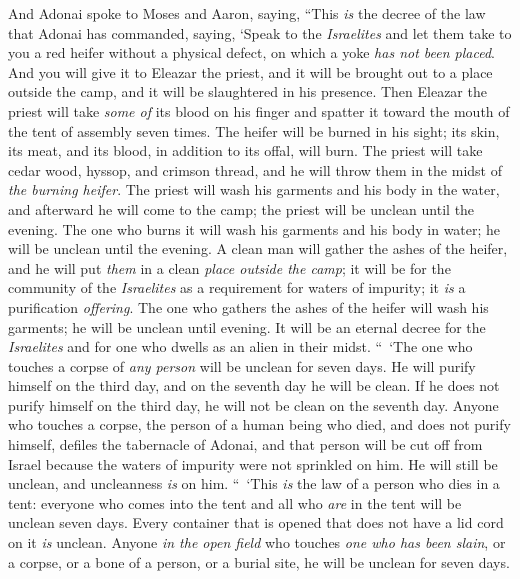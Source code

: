 \begin{biblechapter} %
 And Adonai spoke to Moses and Aaron, saying,
\verse “This \textit{is} the decree of the law that Adonai has commanded, saying, ‘Speak to the \textit{Israelites} and let them take to you a red heifer without a physical defect, on which a yoke \textit{has not been placed}.
\verse And you will give it to Eleazar the priest, and it will be brought out to a place outside the camp, and it will be slaughtered in his presence.
\verse Then Eleazar the priest will take \textit{some of} its blood on his finger and spatter it toward the mouth of the tent of assembly seven times.
\verse The heifer will be burned in his sight; its skin, its meat, and its blood, in addition to its offal, will burn.
\verse The priest will take cedar wood, hyssop, and crimson thread, and he will throw them in the midst of \textit{the burning heifer}.
\verse The priest will wash his garments and his body in the water, and afterward he will come to the camp; the priest will be unclean until the evening.
\verse The one who burns it will wash his garments and his body in water; he will be unclean until the evening.
\verse A clean man will gather the ashes of the heifer, and he will put \textit{them} in a clean \textit{place outside the camp}; it will be for the community of the \textit{Israelites} as a requirement for waters of impurity; it \textit{is} a purification \textit{offering}.
\verse The one who gathers the ashes of the heifer will wash his garments; he will be unclean until evening. It will be an eternal decree for the \textit{Israelites} and for one who dwells as an alien in their midst.
\verse “ ‘The one who touches a corpse of \textit{any person} will be unclean for seven days.
\verse He will purify himself on the third day, and on the seventh day he will be clean. If he does not purify himself on the third day, he will not be clean on the seventh day.
\verse Anyone who touches a corpse, the person of a human being who died, and does not purify himself, defiles the tabernacle of Adonai, and that person will be cut off from Israel because the waters of impurity were not sprinkled on him. He will still be unclean, and uncleanness \textit{is} on him.
\verse “ ‘This \textit{is} the law of a person who dies in a tent: everyone who comes into the tent and all who \textit{are} in the tent will be unclean seven days.
\verse Every container that is opened that does not have a lid cord on it \textit{is} unclean.
\verse Anyone \textit{in the open field} who touches \textit{one who has been slain}, or a corpse, or a bone of a person, or a burial site, he will be unclean for seven days.

\end{biblechapter}
